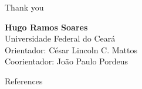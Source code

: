\documentclass[aspectratio=169]{beamer}
\begin{document}
\begin{frame}{Thank you}
  \begin{center}
    \large \textbf{Hugo Ramos Soares} \\
    \normalsize
    Universidade Federal do Ceará \\
    Orientador: César Lincoln C. Mattos \\
    Coorientador: João Paulo Pordeus \\
  \end{center}
\end{frame}

\begin{frame}{References}
  \scriptsize
  
  
\end{frame}
\end{document}
